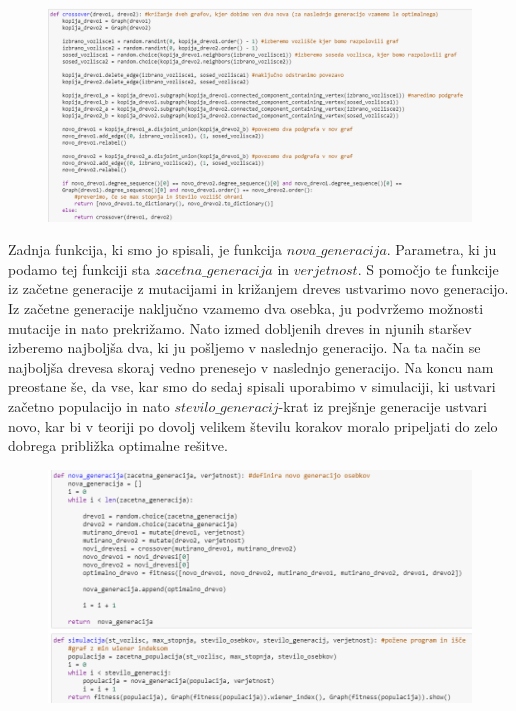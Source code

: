 \documentclass[12pt,a4paper]{amsart}
\theoremstyle{definition} %
\theoremstyle{plain} %
\begin{document}
\begin{figure}[ht]
\centering
\includegraphics[width=1\textwidth]{slika5}
\end{figure}



Zadnja funkcija, ki smo jo spisali, je funkcija $nova\_generacija$. 
Parametra, ki ju podamo tej funkciji sta $zacetna\_generacija$ in $verjetnost$. 
S pomočjo te funkcije iz začetne generacije z mutacijami in križanjem dreves ustvarimo novo generacijo. Iz začetne generacije naključno vzamemo
dva osebka, ju podvržemo možnosti mutacije in nato prekrižamo. Nato izmed dobljenih dreves in njunih staršev izberemo najboljša dva, ki ju
pošljemo v naslednjo generacijo. Na ta način se najboljša drevesa skoraj vedno prenesejo v naslednjo generacijo.
Na koncu nam preostane še, da vse, kar smo do sedaj spisali uporabimo v simulaciji,
ki ustvari začetno populacijo in nato $stevilo\_generacij$-krat iz prejšnje generacije ustvari novo,
kar bi v teoriji po dovolj velikem številu korakov moralo pripeljati do zelo dobrega približka optimalne rešitve.


\begin{figure}[ht]
\centering
\includegraphics[width=1\textwidth]{slika6}
\end{figure}
\end{document}
